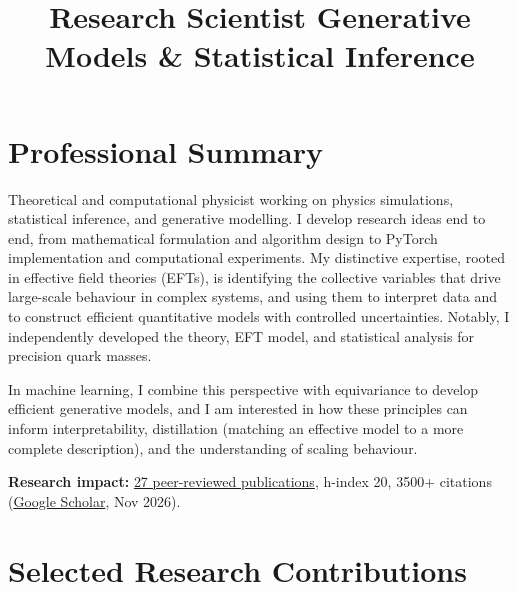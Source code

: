 \documentclass[11pt,a4paper,sans]{moderncv}
\title{Research Scientist \textbar{} Generative Models \& Statistical Inference}
\begin{document}
\renewcommand*{\titlefont}{\Large\itshape}  %
\makecvtitle


\section{Professional Summary}

Theoretical and computational physicist working on physics simulations, statistical inference, and generative modelling. I develop research ideas end to end, from mathematical formulation and algorithm design to PyTorch implementation and computational experiments. My distinctive expertise, rooted in effective field theories (EFTs), is identifying the collective variables that drive large-scale behaviour in complex systems, and using them to interpret data and to construct efficient quantitative models with controlled uncertainties. Notably, I independently developed the theory, EFT model, and statistical analysis for precision quark masses.

\vspace{0.4em}In machine learning, I combine this perspective with equivariance to develop efficient generative models, and I am interested in how these principles can inform interpretability, distillation (matching an effective model to a more complete description), and the understanding of scaling behaviour.

\vspace{0.5em} \textbf{Research impact:} \href{https://jkomijani.github.io/docs/Publications.pdf}{27 peer-reviewed publications}, h-index 20, 3500+ citations (\href{https://scholar.google.com/citations?user=EBV_Sl0AAAAJ&hl=en}{Google Scholar}, Nov 2026).

\section{Selected Research Contributions}
\end{document}
